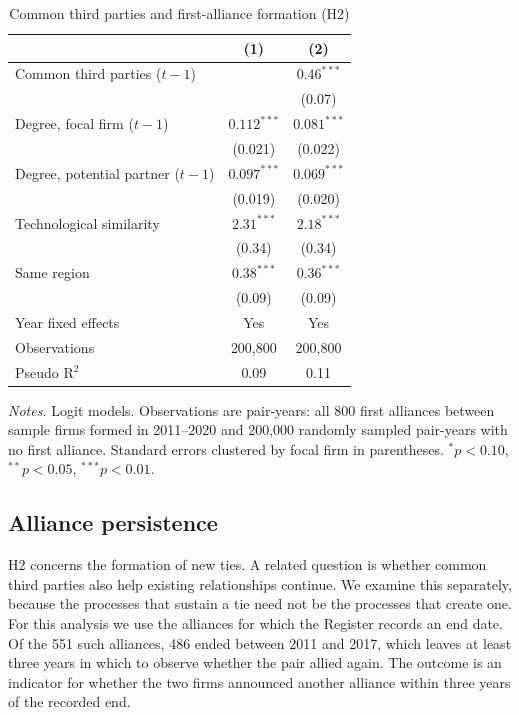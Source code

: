 \documentclass[12pt]{article}
\begin{document}
\begin{table}[!htbp]
\centering
\begin{threeparttable}
\caption{Common third parties and first-alliance formation (H2)}
\label{tab:h2}
\small
\begin{tabular}{lcc}
\toprule
 & (1) & (2) \\
\midrule
Common third parties ($t-1$) & & $0.46^{***}$ \\
 & & (0.07) \\
Degree, focal firm ($t-1$) & $0.112^{***}$ & $0.081^{***}$ \\
 & (0.021) & (0.022) \\
Degree, potential partner ($t-1$) & $0.097^{***}$ & $0.069^{***}$ \\
 & (0.019) & (0.020) \\
Technological similarity & $2.31^{***}$ & $2.18^{***}$ \\
 & (0.34) & (0.34) \\
Same region & $0.38^{***}$ & $0.36^{***}$ \\
 & (0.09) & (0.09) \\
\midrule
Year fixed effects & Yes & Yes \\
Observations & 200,800 & 200,800 \\
Pseudo R$^2$ & 0.09 & 0.11 \\
\bottomrule
\end{tabular}
\begin{tablenotes}
\footnotesize
\item \textit{Notes.} Logit models. Observations are pair-years: all 800 first alliances between sample firms formed in 2011--2020 and 200,000 randomly sampled pair-years with no first alliance. Standard errors clustered by focal firm in parentheses. $^{*}p<0.10$, $^{**}p<0.05$, $^{***}p<0.01$.
\end{tablenotes}
\end{threeparttable}
\end{table}

\subsection{Alliance persistence}

H2 concerns the formation of new ties. A related question is whether common third parties also help existing relationships continue. We examine this separately, because the processes that sustain a tie need not be the processes that create one. For this analysis we use the alliances for which the Register records an end date. Of the 551 such alliances, 486 ended between 2011 and 2017, which leaves at least three years in which to observe whether the pair allied again. The outcome is an indicator for whether the two firms announced another alliance within three years of the recorded end.
\end{document}

